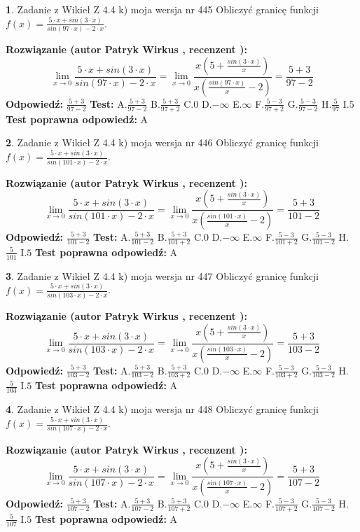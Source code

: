 \documentclass[12pt, a4paper]{article}
\theoremstyle{definition} %
\newtheorem{zad}{}
\newcommand{\zadStart}[1]{\begin{zad}#1\newline}
\newcommand{\zadStop}{\end{zad}}
\newcommand{\rozwStart}[2]{\noindent \textbf{Rozwiązanie (autor #1 , recenzent #2): }\newline}
\newcommand{\rozwStop}{\newline}
\newcommand{\odpStart}{\noindent \textbf{Odpowiedź:}\newline}
\newcommand{\odpStop}{\newline}
\newcommand{\testStart}{\noindent \textbf{Test:}\newline}
\newcommand{\testStop}{\newline}
\newcommand{\kluczStart}{\noindent \textbf{Test poprawna odpowiedź:}\newline}
\newcommand{\kluczStop}{\newline}
\begin{document}
\zadStart{Zadanie z Wikieł Z 4.4 k) moja wersja nr 445}
Obliczyć granicę funkcji $f(x)=\frac{5\cdot x +sin(3\cdot x)}{sin(97\cdot x) -2\cdot x}$.
\zadStop
\rozwStart{Patryk Wirkus}{}
$$\lim\limits_{x\to 0}\frac{5\cdot x +sin(3\cdot x)}{sin(97\cdot x) -2\cdot x}
=\lim\limits_{x\to 0}\frac{x(5+\frac{sin(3\cdot x)}{x})}{x(\frac{sin(97\cdot x)}{x}-2)}
=\frac{5+3}{97-2}$$
\rozwStop
\odpStart
$\frac{5+3}{97-2}$
\odpStop
\testStart
A.$\frac{5+3}{97-2}$
B.$\frac{5+3}{97+2}$
C.$0$
D.$-\infty$
E.$\infty$
F.$\frac{5-3}{97+2}$
G.$\frac{5-3}{97-2}$
H.$\frac{5}{97}$
I.$5$
\testStop
\kluczStart
A
\kluczStop



\zadStart{Zadanie z Wikieł Z 4.4 k) moja wersja nr 446}
Obliczyć granicę funkcji $f(x)=\frac{5\cdot x +sin(3\cdot x)}{sin(101\cdot x) -2\cdot x}$.
\zadStop
\rozwStart{Patryk Wirkus}{}
$$\lim\limits_{x\to 0}\frac{5\cdot x +sin(3\cdot x)}{sin(101\cdot x) -2\cdot x}
=\lim\limits_{x\to 0}\frac{x(5+\frac{sin(3\cdot x)}{x})}{x(\frac{sin(101\cdot x)}{x}-2)}
=\frac{5+3}{101-2}$$
\rozwStop
\odpStart
$\frac{5+3}{101-2}$
\odpStop
\testStart
A.$\frac{5+3}{101-2}$
B.$\frac{5+3}{101+2}$
C.$0$
D.$-\infty$
E.$\infty$
F.$\frac{5-3}{101+2}$
G.$\frac{5-3}{101-2}$
H.$\frac{5}{101}$
I.$5$
\testStop
\kluczStart
A
\kluczStop



\zadStart{Zadanie z Wikieł Z 4.4 k) moja wersja nr 447}
Obliczyć granicę funkcji $f(x)=\frac{5\cdot x +sin(3\cdot x)}{sin(103\cdot x) -2\cdot x}$.
\zadStop
\rozwStart{Patryk Wirkus}{}
$$\lim\limits_{x\to 0}\frac{5\cdot x +sin(3\cdot x)}{sin(103\cdot x) -2\cdot x}
=\lim\limits_{x\to 0}\frac{x(5+\frac{sin(3\cdot x)}{x})}{x(\frac{sin(103\cdot x)}{x}-2)}
=\frac{5+3}{103-2}$$
\rozwStop
\odpStart
$\frac{5+3}{103-2}$
\odpStop
\testStart
A.$\frac{5+3}{103-2}$
B.$\frac{5+3}{103+2}$
C.$0$
D.$-\infty$
E.$\infty$
F.$\frac{5-3}{103+2}$
G.$\frac{5-3}{103-2}$
H.$\frac{5}{103}$
I.$5$
\testStop
\kluczStart
A
\kluczStop



\zadStart{Zadanie z Wikieł Z 4.4 k) moja wersja nr 448}
Obliczyć granicę funkcji $f(x)=\frac{5\cdot x +sin(3\cdot x)}{sin(107\cdot x) -2\cdot x}$.
\zadStop
\rozwStart{Patryk Wirkus}{}
$$\lim\limits_{x\to 0}\frac{5\cdot x +sin(3\cdot x)}{sin(107\cdot x) -2\cdot x}
=\lim\limits_{x\to 0}\frac{x(5+\frac{sin(3\cdot x)}{x})}{x(\frac{sin(107\cdot x)}{x}-2)}
=\frac{5+3}{107-2}$$
\rozwStop
\odpStart
$\frac{5+3}{107-2}$
\odpStop
\testStart
A.$\frac{5+3}{107-2}$
B.$\frac{5+3}{107+2}$
C.$0$
D.$-\infty$
E.$\infty$
F.$\frac{5-3}{107+2}$
G.$\frac{5-3}{107-2}$
H.$\frac{5}{107}$
I.$5$
\testStop
\kluczStart
A
\kluczStop
\end{document}
